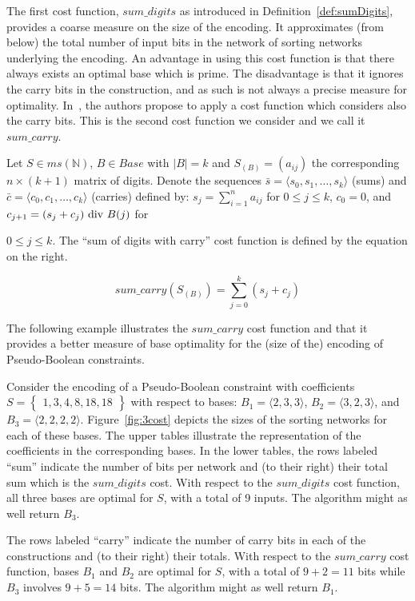 \documentclass[envcountsame]{llncs}
\newcommand\tuple[1]{\langle #1 \rangle}
\newcommand{\Base}{\mathit{Base}}
\newcommand{\intMultiSet}{\mathit{ms(\mathbb{N})}}
\newcommand{\sumCarry}{\mathit{sum\_carry}}
\newcommand{\sumDigits}{\mathit{sum\_digits}}
\newcommand{\set}[1]{\left\{
      \begin{array}{l}#1\end{array}
        \right\}}
\begin{document}
The first cost function, $\sumDigits$ as introduced in
Definition~\ref{def:sumDigits}, provides a coarse measure on the size
of the encoding.  It approximates (from below) the total number of
input bits in the network of sorting networks underlying the
encoding. An advantage in using this cost function is that there always
exists an optimal base which is prime. The disadvantage is that it
ignores the carry bits in the construction, and as such is not always
a precise measure for optimality.
In~\cite{EenS06}, the authors propose to apply a cost function which
considers also the carry bits. This is the second cost function we
consider and we call it  $\sumCarry$.

\begin{definition}[cost function: $\sumCarry$]
\label{cost2}
Let $S\in\intMultiSet$, $B\in\Base$ with $|B|=k$ and
$S_{(B)}=(a_{ij})$ the corresponding $n\times (k+1)$ matrix of digits.
Denote the sequences $\bar s=\tuple{s_0,s_1,\ldots,s_k}$ (sums) and 
$\bar c= \tuple{c_0,c_1,\ldots,c_k}$ (carries) defined by: 
$s_j=\sum_{i=1}^n a_{ij}$ for $0\leq j\leq k$, $c_0=0$, and 
$c_{j+1} = (s_j+c_j) \mbox{\rm ~div~} B(j)$ for\\
\begin{minipage}[t]{0.5\linewidth}
$0\leq j\leq k$.
The ``sum of digits with carry''
cost function is defined by the equation on the right.
\end{minipage}\quad
\begin{minipage}[t]{0.5\linewidth}
\vspace{-6mm}
\[\sumCarry(S_{(B)}) = \sum_{j=0}^{k}(s_j+c_j)
\]
\end{minipage}
\end{definition}


The following example illustrates the $\sumCarry$ cost function and
that it provides a better measure of base optimality for the (size of
the) encoding of Pseudo-Boolean constraints.

           
\begin{example}\label{runningD}

  Consider the encoding of a Pseudo-Boolean constraint with
  coefficients $S=\set{1,3,4,8,18,18}$ with respect to  bases: $B_1=\tuple{2,3,3}$, $B_2=\tuple{3,2,3}$, and
  $B_3=\tuple{2,2,2,2}$.
Figure~\ref{fig:3cost} depicts the sizes of the sorting networks for
  each of these bases.  The upper tables  illustrate the representation of the coefficients in the
  corresponding bases. 
In the lower tables, the rows labeled ``sum'' indicate the
  number of bits per network and (to their right) their total sum which
  is the $\sumDigits$ cost.
With respect to the $\sumDigits$ cost function, all three bases are
  optimal for $S$, with a total of 9 inputs. The algorithm might as
  well return $B_3$.

  The rows labeled ``carry'' indicate the number of carry bits in each
  of the constructions and (to their right) their totals. With respect
  to the $\sumCarry$ cost function, bases $B_1$ and $B_2$ are optimal
  for $S$, with a total of $9+2=11$ bits while $B_3$ involves $9+5=14$
  bits. The algorithm might as well return $B_1$.
\end{example}
\end{document}
